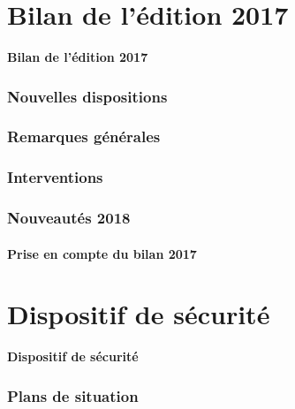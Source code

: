 \documentclass{beamer}
\begin{document}

\section{Bilan de l'édition 2017}

\begin{frame}

\centering\Huge{\textbf{Bilan de l'édition 2017}}

\end{frame}

\begin{frame}

\frametitle{Nouvelles dispositions}

\end{frame}

\begin{frame}

\frametitle{Remarques générales}

\end{frame}

\begin{frame}

\frametitle{Interventions}

\end{frame}

\begin{frame}

\frametitle{Nouveautés 2018}
\framesubtitle{Prise en compte du bilan 2017}

\end{frame}


\section{Dispositif de sécurité}

\begin{frame}

\centering\Huge{\textbf{Dispositif de sécurité}}

\end{frame}

\begin{frame}

\frametitle{Plans de situation}

\end{frame}
\end{document}
